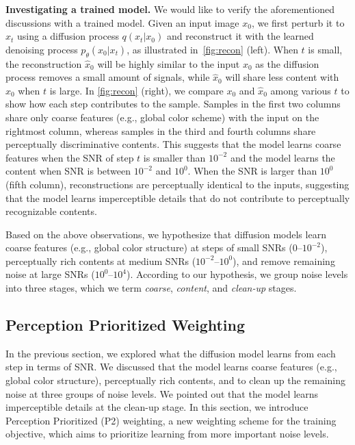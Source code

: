 \textbf{Investigating a trained model.  }
We would like to verify the aforementioned discussions with a trained model.
Given an input image $x_0$, we first perturb it to $x_t$ using a diffusion process $q(x_t|x_0)$ and reconstruct it with the learned denoising process $p_\theta(\hat{x}_0|x_t)$, as illustrated in~\cref{fig:recon} (left). When $t$ is small, the reconstruction $\hat{x}_0$ will be highly similar to the input $x_0$ as the diffusion process removes a small amount of signals, while $\hat{x}_0$ will share less content with $x_0$ when $t$ is large. In \cref{fig:recon} (right), we compare $x_0$ and $\hat{x}_0$ among various $t$ to show how each step contributes to the sample. 
Samples in the first two columns share only coarse features (e.g., global color scheme) with the input on the rightmost column, whereas samples in the third and fourth columns share perceptually discriminative contents. This suggests that the model learns coarse features when the SNR of step $t$ is smaller than $10^{-2}$ and the model learns the content when SNR is between $10^{-2}$ and $10^0$. When the SNR is larger than $10^0$ (fifth column), reconstructions are perceptually identical to the inputs, suggesting that the model learns imperceptible details that do not contribute to perceptually recognizable contents. 


Based on the above observations, we hypothesize that diffusion models learn coarse features (e.g., global color structure) at steps of small SNRs ($0\text{--}10^{-2}$), perceptually rich contents at medium SNRs ($10^{-2}\text {--}10^0$), and remove remaining noise at large SNRs ($10^{0}\text{--}10^4$). 
According to our hypothesis, we group noise levels into three stages, which we term \textit{coarse}, \textit{content}, and \textit{clean-up} stages. 



\subsection{Perception Prioritized Weighting}
\label{sec:method_3.2}

In the previous section, we explored what the diffusion model learns from each step in terms of SNR. We discussed that the model learns coarse features (e.g., global color structure), perceptually rich contents, and to clean up the remaining noise at three groups of noise levels. We pointed out that the model learns imperceptible details at the clean-up stage. In this section, we introduce Perception Prioritized (P2) weighting, a new weighting scheme for the training objective, which aims to prioritize learning from more important noise levels.

